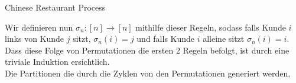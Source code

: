 \begin{section}{Chinese Restaurant Process}
\begin{enumerate}
\end{enumerate}
Wir definieren nun $\sigma_n: [n] \rightarrow [n]$ mithilfe dieser Regeln, sodass falls Kunde $i$ links von Kunde $j$ sitzt, $\sigma_n(i) = j$ und falls Kunde $i$ alleine sitzt $\sigma_n(i) = i$. Dass diese Folge von
Permutationen die ersten 2 Regeln befolgt, ist durch eine triviale Induktion ersichtlich. 
\\
Die Partitionen die durch die Zyklen von den Permutationen generiert werden, 
\end{section}